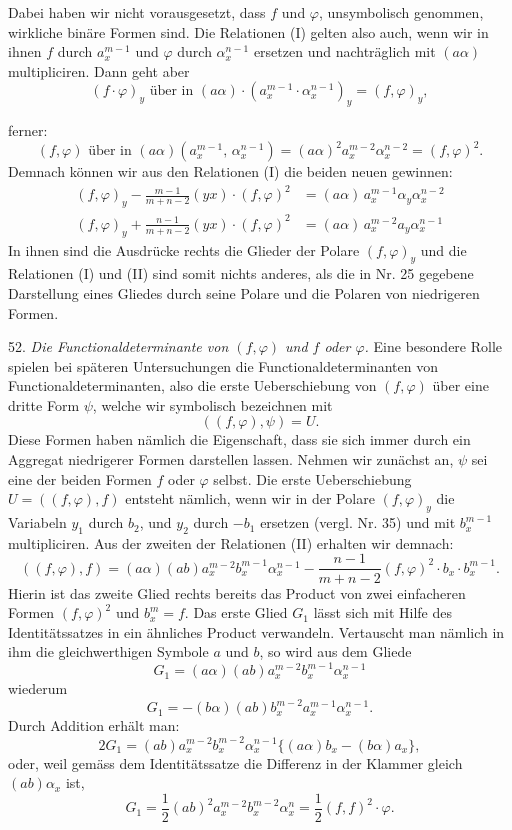 \documentclass[11pt]{article}
\providecommand{\weberpage}[1]{}
\providecommand{\weq}[2]{\begin{equation}\tag{#1}#2\end{equation}}
\begin{document}
Dabei haben wir nicht vorausgesetzt, dass $f$ und $\varphi$, unsymbolisch genommen, wirkliche binäre Formen sind. Die Relationen (I) gelten also auch, wenn wir in ihnen $f$ durch $a_x^{m-1}$ und $\varphi$ durch $\alpha_x^{n-1}$ ersetzen und nachträglich mit $(a\alpha)$ multipliciren. Dann geht aber
\[
(f\cdot\varphi)_y \text{ über in } (a\alpha)\cdot(a_x^{m-1}\cdot\alpha_x^{n-1})_y = (f,\varphi)_y,
\]


\weberpage{56}

ferner:
\[
(f,\varphi) \text{ über in } (a\alpha)(a_x^{m-1},\,\alpha_x^{n-1}) = (a\alpha)^2a_x^{m-2}\alpha_x^{n-2} = (f,\varphi)^2.
\]
Demnach können wir aus den Relationen (I) die beiden neuen gewinnen:
\weq{II}{
\begin{aligned}
(f,\varphi)_y - \frac{m-1}{m+n-2}(yx)\cdot(f,\varphi)^2 &= (a\alpha)\,a_x^{m-1}\alpha_y\alpha_x^{n-2} \\
(f,\varphi)_y + \frac{n-1}{m+n-2}(yx)\cdot(f,\varphi)^2 &= (a\alpha)\,a_x^{m-2}a_y\alpha_x^{n-1}
\end{aligned}
}
In ihnen sind die Ausdrücke rechts die Glieder der Polare $(f,\varphi)_y$ und die Relationen (I) und (II) sind somit nichts anderes, als die in Nr. 25 gegebene Darstellung eines Gliedes durch seine Polare und die Polaren von niedrigeren Formen.

52. \textit{Die Functionaldeterminante von $(f,\varphi)$ und $f$ oder $\varphi$.} Eine besondere Rolle spielen bei späteren Untersuchungen die Functionaldeterminanten von Functionaldeterminanten, also die erste Ueberschiebung von $(f,\varphi)$ über eine dritte Form $\psi$, welche wir symbolisch bezeichnen mit
\[
((f,\varphi),\psi) = U.
\]
Diese Formen haben nämlich die Eigenschaft, dass sie sich immer durch ein Aggregat niedrigerer Formen darstellen lassen. Nehmen wir zunächst an, $\psi$ sei eine der beiden Formen $f$ oder $\varphi$ selbst. Die erste Ueberschiebung $U = ((f,\varphi),f)$ entsteht nämlich, wenn wir in der Polare $(f,\varphi)_y$ die Variabeln $y_1$ durch $b_2$, und $y_2$ durch $-b_1$ ersetzen (vergl. Nr. 35) und mit $b_x^{m-1}$ multipliciren. Aus der zweiten der Relationen (II) erhalten wir demnach:
\[
((f,\varphi),f) = (a\alpha)(ab)a_x^{m-2}b_x^{m-1}\alpha_x^{n-1} - \frac{n-1}{m+n-2}(f,\varphi)^2\cdot b_x\cdot b_x^{m-1}.
\]
Hierin ist das zweite Glied rechts bereits das Product von zwei einfacheren Formen $(f,\varphi)^2$ und $b_x^m = f$. Das erste Glied $G_1$ lässt sich mit Hilfe des Identitätssatzes in ein ähnliches Product verwandeln. Vertauscht man nämlich in ihm die gleichwerthigen Symbole $a$ und $b$, so wird aus dem Gliede
\[
G_1 = (a\alpha)(ab)a_x^{m-2}b_x^{m-1}\alpha_x^{n-1}
\]
wiederum
\[
G_1 = -(b\alpha)(ab)b_x^{m-2}a_x^{m-1}\alpha_x^{n-1}.
\]
Durch Addition erhält man:
\[
2G_1 = (ab)a_x^{m-2}b_x^{m-2}\alpha_x^{n-1}\{(a\alpha)b_x - (b\alpha)a_x\},
\]
oder, weil gemäss dem Identitätssatze die Differenz in der Klammer gleich $(ab)\alpha_x$ ist,
\[
G_1 = \frac{1}{2}(ab)^2a_x^{m-2}b_x^{m-2}\alpha_x^n = \frac{1}{2}(f,f)^2\cdot\varphi.
\]
\end{document}
